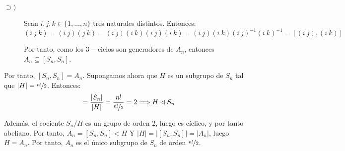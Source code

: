 \begin{ejercicio}
\begin{enumerate}
\begin{description}
            \item[$\supset)$] Sean $i,j,k\in \{1,\ldots,n\}$ tres naturales distintos. Entonces:
            \begin{equation*}
                (i\ j\ k) = (i\ j)(j\ k) = (i\ j)(i\ k)(i\ j)(i\ k)
                = (i\ j)(i\ k)(i\ j)^{-1}(i\ k)^{-1} = [(i\ j),(i\ k)]
            \end{equation*}

            Por tanto, como los $3-$ciclos son generadores de $A_n$, entonces $A_n\subseteq [S_n,S_n]$.
        \end{description}

        Por tanto, $[S_n,S_n]=A_n$. Supongamos ahora que $H$ es un subgrupo de $S_n$ tal que $|H|=\nicefrac{n!}{2}$. Entonces:
        \begin{equation*}
            [S_n : H] = \frac{|S_n|}{|H|} = \frac{n!}{\nicefrac{n!}{2}} = 2
            \Longrightarrow H\lhd S_n
        \end{equation*}

        Además, el cociente $S_n/H$ es un grupo de orden $2$, luego es cíclico, y por tanto abeliano. Por tanto, $A_n=[S_n,S_n]<H$ Y $|H|=|[S_n,S_n]|=|A_n|$, luego $H=A_n$. Por tanto, $A_n$ es el único subgrupo de $S_n$ de orden $\nicefrac{n!}{2}$.
    \end{enumerate}
\end{ejercicio}